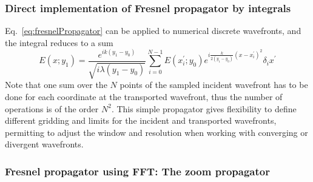 \documentclass{iucr}              %
\begin{document}
\subsubsection{Direct implementation of Fresnel propagator by integrals}
\label{sec:integralPropagator}

Eq.~\ref{eq:fresnelPropagator} can be applied to numerical discrete wavefronts, and the integral reduces to a sum
\begin{equation}\label{eq:discretefresnel1D}
 E(x;y_1) = \frac {e^{i k (y_1-y_0) }}{ \sqrt{i \lambda (y_1-y_0)}} \sum_{i=0}^{N-1}  E(x^\prime_i; y_0) e^{i \frac{k}{2 (y_1-y_0)} (x - x_i^\prime)^2 } \delta_i x^\prime
\end{equation}
Note that one sum over the $N$ points of the sampled incident wavefront has to be done for each coordinate at the transported wavefront, thus the number of operations is of the order $N^2$. This simple propagator gives flexibility to define different gridding and limits for the incident and transported wavefronts, permitting to adjust the window and resolution when working with converging or divergent wavefronts. 

\subsubsection{Fresnel propagator using FFT: The zoom propagator}
\label{sec:zoomPropagator}
\end{document}
